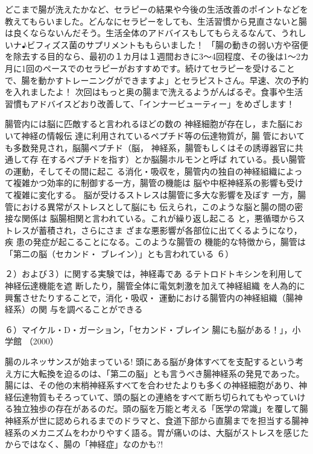 どこまで腸が洗えたかなど、セラピーの結果や今後の生活改善のポイントなどを教えてもらいました。どんなにセラピーをしても、生活習慣から見直さないと腸は良くならないんだそう。生活全体のアドバイスもしてもらえるなんて、うれしいナ♪ビフィズス菌のサプリメントももらいました！
「腸の動きの弱い方や宿便を除去する目的なら、最初の１カ月は１週間おきに3～4回程度、その後は1～2カ月に1回のペースでのセラピーがおすすめです。続けてセラピーを受けることで、腸を動かすトレーニングができますよ」とセラピストさん。早速、次の予約を入れましたよ！
次回はもっと奥の腸まで洗えるようがんばるぞ。食事や生活習慣もアドバイスどおり改善して、「インナービューティー」をめざします！




腸管内には脳に匹敵すると言われるほどの数の
神経細胞が存在し，また脳において神経の情報伝
達に利用されているペプチド等の伝達物質が，腸
管においても多数発見され，脳腸ペプチド（脳，
神経系，腸管もしくはその誘導器官に共通して存
在するペプチドを指す）とか脳腸ホルモンと呼ば
れている。長い腸管の運動，そしてその間に起こ
る消化・吸収を，腸管内の独自の神経組織によっ
て複雑かつ効率的に制御する一方，腸管の機能は
脳や中枢神経系の影響も受けて複雑に変化する。
脳が受けるストレスは腸管に多大な影響を及ぼす
一方，腸管における異常がストレスとして脳にも
伝えられ，このような脳と腸の間の密接な関係は
脳腸相関と言われている。これが繰り返し起こる
と，悪循環からストレスが蓄積され，さらにさま
ざまな悪影響が各部位に出てくるようになり，疾
患の発症が起こることになる。このような腸管の
機能的な特徴から，腸管は「第二の脳（セカンド・
ブレイン）」とも言われている
６）

２）および３）に関する実験では，神経毒であ
るテトロドトキシンを利用して神経伝達機能を遮
断したり，腸管全体に電気刺激を加えて神経組織
を人為的に興奮させたりすることで，消化・吸収・
運動における腸管内の神経組織（腸神経系）の関
与を調べることができる

６）マイケル・D・ガーション，「セカンド・ブレイン
腸にも脳がある！」，小学館 （2000）


腸のルネッサンスが始まっている!
頭にある脳が身体すべてを支配するという考え方に大転換を迫るのは、「第二の脳」とも言うべき腸神経系の発見であった。腸には、その他の末梢神経系すべてを合わせたよりも多くの神経細胞があり、神経伝達物質もそろっていて、頭の脳との連絡をすべて断ち切られてもやっていける独立独歩の存在があるのだ。頭の脳を万能と考える「医学の常識」を覆して腸神経系が世に認められるまでのドラマと、食道下部から直腸までを担当する腸神経系のメカニズムをわかりやすく語る。胃が痛いのは、大脳がストレスを感じたからではなく、腸の「神経症」なのかも?! 






